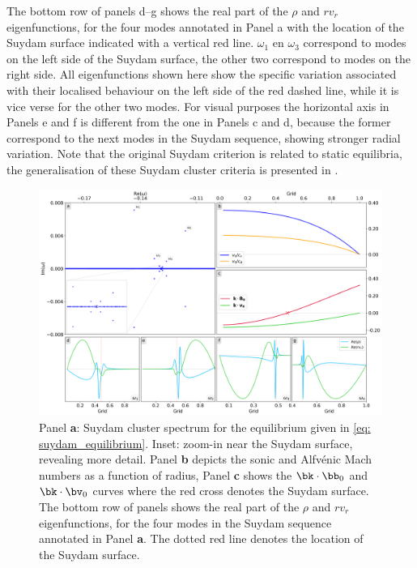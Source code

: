 The bottom row of panels d--g shows the real part of the $\rho$ and $r v_r$ eigenfunctions, for the four modes annotated in Panel a with the location of the Suydam surface indicated with a vertical red line. $\omega_1$ en $\omega_3$ correspond to modes on the left side of the Suydam surface, the other two correspond to modes on the right side. All eigenfunctions shown here show the specific variation associated with their localised behaviour on the left side of the red dashed line, while it is vice verse for the other two modes. For visual purposes the horizontal axis in Panels e and f is different from the one in Panels c and d, because the former correspond to the next modes in the Suydam sequence, showing stronger radial variation. Note that the original Suydam criterion \citep{book_MHD} is related to static equilibria, the generalisation of these Suydam cluster criteria is presented in \citet{wang2004}.

\begin{figure}[t]
  \centering
  \includegraphics[width=\textwidth]{suydam_cluster.png}
  \caption{
    Panel \textbf{a}: Suydam cluster spectrum for the equilibrium given in \eqref{eq: suydam_equilibrium}. Inset: zoom-in near the Suydam surface, revealing more detail. Panel \textbf{b} depicts the sonic and Alfv\'enic Mach numbers as a function of radius, Panel \textbf{c} shows the $\bk \cdot \bb_0$ and $\bk \cdot \bv_0$ curves where the red cross denotes the Suydam surface. The bottom row of panels shows the real part of the $\rho$ and $r v_r$ eigenfunctions, for the four modes in the Suydam sequence annotated in Panel \textbf{a}. The dotted red line denotes the location of the Suydam surface.
  }
  \label{fig: suydam_cluster}
\end{figure}



